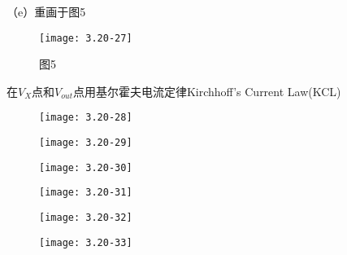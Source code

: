 \scalebox{3}{（e）}

（e）重画于图5

		\begin{figure}[H] %
	\begin{minipage}{\linewidth}
		\texttt{[image: 3.20-27]}
	\end{minipage}
	\caption*{图5} %
\end{figure}




在$V_{X}$点和$V_{out}$点用基尔霍夫电流定律Kirchhoff’s Current Law(KCL)


		\begin{figure}[H] %
	\begin{minipage}{\linewidth}
		\texttt{[image: 3.20-28]}
	\end{minipage}
\end{figure}

\begin{figure}[H] %
	\begin{minipage}{\linewidth}
		\texttt{[image: 3.20-29]}
	\end{minipage}
\end{figure}

\begin{figure}[H] %
	\begin{minipage}{\linewidth}
		\texttt{[image: 3.20-30]}
	\end{minipage}
\end{figure}

\begin{figure}[H] %
	\begin{minipage}{\linewidth}
		\texttt{[image: 3.20-31]}
	\end{minipage}
\end{figure}

\begin{figure}[H] %
	\begin{minipage}{\linewidth}
		\texttt{[image: 3.20-32]}
	\end{minipage}
\end{figure}

\begin{figure}[H] %
	\begin{minipage}{\linewidth}
		\texttt{[image: 3.20-33]}
	\end{minipage}
\end{figure}

